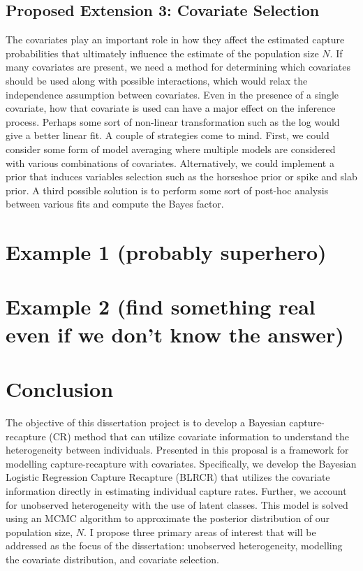 \documentclass[
  12pt,
]{article}
\begin{document}
\subsection{Proposed Extension 3: Covariate Selection}
\label{Sec:variableselection}

The covariates play an important role in how they affect the estimated
capture probabilities that ultimately influence the estimate of the
population size \(N\). If many covariates are present, we need a method
for determining which covariates should be used along with possible
interactions, which would relax the independence assumption between
covariates. Even in the presence of a single covariate, how that
covariate is used can have a major effect on the inference process.
Perhaps some sort of non-linear transformation such as the log would
give a better linear fit. A couple of strategies come to mind. First, we
could consider some form of model averaging where multiple models are
considered with various combinations of covariates. Alternatively, we
could implement a prior that induces variables selection such as the
horseshoe prior or spike and slab prior. A third possible solution is to
perform some sort of post-hoc analysis between various fits and compute
the Bayes factor.

\section{Example 1 (probably superhero)}
\label{Sec:example1}

\section{Example 2 (find something real even if we don't know the answer)}
\label{Sec:example2}

\section{Conclusion}
\label{Sec:Conclusion}

The objective of this dissertation project is to develop a Bayesian
capture-recapture (CR) method that can utilize covariate information to
understand the heterogeneity between individuals. Presented in this
proposal is a framework for modelling capture-recapture with covariates.
Specifically, we develop the Bayesian Logistic Regression Capture
Recapture (BLRCR) that utilizes the covariate information directly in
estimating individual capture rates. Further, we account for unobserved
heterogeneity with the use of latent classes. This model is solved using
an MCMC algorithm to approximate the posterior distribution of our
population size, \(N\). I propose three primary areas of interest that
will be addressed as the focus of the dissertation: unobserved
heterogeneity, modelling the covariate distribution, and covariate
selection.
\end{document}
